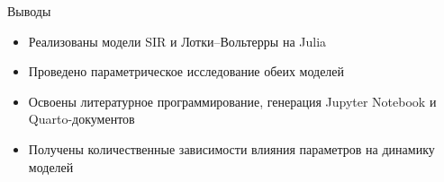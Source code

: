 \documentclass[
  ignorenonframetext,
  aspectratio=169,
  russian,
]{beamer}
\providecommand{\tightlist}{%
  \setlength{\itemsep}{0pt}\setlength{\parskip}{0pt}}
\begin{document}
\begin{frame}{Выводы}
\protect{}\label{ux432ux44bux432ux43eux434ux44b}
\begin{itemize}[<+->]
\tightlist
\item
  Реализованы модели SIR и Лотки--Вольтерры на Julia
\item
  Проведено параметрическое исследование обеих моделей
\item
  Освоены литературное программирование, генерация Jupyter Notebook и
  Quarto-документов
\item
  Получены количественные зависимости влияния параметров на динамику
  моделей
\end{itemize}
\end{frame}
\end{document}
